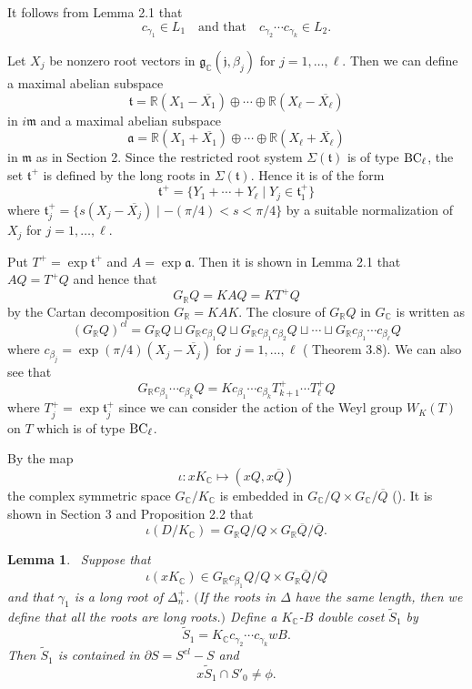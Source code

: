 \documentclass[12pt,a4paper]{amsart}
\def\frak{\mathfrak}
\newtheorem{lemma}[theorem]{Lemma}
\theoremstyle{definition}
\theoremstyle{remark}
\numberwithin{equation}{section}
\def\br{\mathbb R}
\def\bc{\mathbb C}
\def\p{\partial}
\begin{document}
It follows from Lemma 2.1 that
$$c_{\gamma_1}\in L_1\quad\mbox{and that}\quad c_{\gamma_2}\cdots c_{\gamma_k}\in L_2.$$

Let $X_j$ be nonzero root vectors in $\frak{g}_\bc(\frak{j},\beta_j)$ for $j=1,\ldots,\ell$. Then we can define a maximal abelian subspace
$$\frak{t}=\br(X_1-\overline{X_1})\oplus\cdots\oplus\br(X_\ell-\overline{X_\ell})$$
in $i\frak{m}$ and a maximal abelian subspace
$$\frak{a}=\br(X_1+\overline{X_1})\oplus\cdots\oplus\br(X_\ell+\overline{X_\ell})$$
in $\frak{m}$ as in \cite{GM1} Section 2. Since the restricted root system $\Sigma(\frak{t})$ is of type ${\rm BC}_\ell$, the set $\frak{t}^+$ is defined by the long roots in $\Sigma(\frak{t})$. Hence it is of the form
$$\frak{t}^+=\{Y_1+\cdots+Y_\ell\mid Y_j\in\frak{t}_1^+\}$$
where $\frak{t}_j^+=\{s(X_j-\overline{X_j})\mid -(\pi/4)<s<\pi/4\}$ by a suitable normalization of $X_j$ for $j=1,\ldots,\ell$.

Put $T^+=\exp\frak{t}^+$ and $A=\exp\frak{a}$. Then it is shown in \cite{GM1} Lemma 2.1 that $AQ=T^+Q$ and hence that
$$G_\br Q=KAQ=KT^+Q$$
by the Cartan decomposition $G_\br=KAK$. The closure of $G_\br Q$ in $G_\bc$ is written as
$$(G_\br Q)^{cl}=G_\br Q\sqcup G_\br c_{\beta_1}Q\sqcup G_\br c_{\beta_1}c_{\beta_2}Q\sqcup \cdots\sqcup G_\br c_{\beta_1}\cdots c_{\beta_\ell}Q$$
where $c_{\beta_j}=\exp(\pi/4)(X_j-\overline{X_j})$ for $j=1,\ldots,\ell$ (\cite{WZ0} Theorem 3.8). We can also see that
\begin{equation}
G_\br c_{\beta_1}\cdots c_{\beta_k}Q=Kc_{\beta_1}\cdots c_{\beta_k}T_{k+1}^+\cdots T_\ell^+Q \tag{2.1}
\end{equation}
where $T_j^+=\exp\frak{t}_j^+$ since we can consider the action of the Weyl group $W_K(T)$ on $T$ which is of type ${\rm BC}_\ell$.

By the map
$$\iota: xK_\bc\mapsto (xQ,x\overline{Q})$$
the complex symmetric space $G_\bc/K_\bc$ is embedded in $G_\bc/Q\times G_\bc/\overline{Q}$ (\cite{WZ1}). It is shown in \cite{BHH} Section 3 and \cite{GM1} Proposition 2.2 that
$$\iota(D/K_\bc)=G_\br Q/Q\times G_\br \overline{Q}/\overline{Q}.$$

\begin{lemma} \ Suppose that
$$\iota(xK_\bc)\in G_\br c_{\beta_1}Q/Q\times G_\br\overline{Q}/\overline{Q}$$
and that $\gamma_1$ is a long root of $\Delta_n^+$. $($If the roots in $\Delta$ have the same length, then we define that all the roots are long roots.$)$ Define a $K_\bc$-$B$ double coset $\widetilde{S}_1$ by
$$\widetilde{S}_1=K_\bc c_{\gamma_2}\cdots c_{\gamma_k}wB.$$
Then $\widetilde{S}_1$ is contained in $\p S=S^{cl}-S$ and
$$x\widetilde{S}_1\cap S'_0\ne\phi.$$
\end{lemma}
\end{document}
